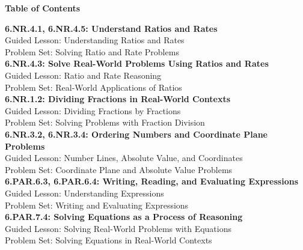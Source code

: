 \documentclass[12pt]{book}
\begin{document}
\begin{center}
    {\LARGE \textbf{Table of Contents}}\\[0.5cm]
\end{center}

\noindent
\textbf{6.NR.4.1, 6.NR.4.5: Understand Ratios and Rates}\\
\hspace*{2em} Guided Lesson: Understanding Ratios and Rates\\
\hspace*{2em} Problem Set: Solving Ratio and Rate Problems\\[0.3cm]

\textbf{6.NR.4.3: Solve Real-World Problems Using Ratios and Rates}\\
\hspace*{2em} Guided Lesson: Ratio and Rate Reasoning\\
\hspace*{2em} Problem Set: Real-World Applications of Ratios\\[0.3cm]

\textbf{6.NR.1.2: Dividing Fractions in Real-World Contexts}\\
\hspace*{2em} Guided Lesson: Dividing Fractions by Fractions\\
\hspace*{2em} Problem Set: Solving Problems with Fraction Division\\[0.3cm]

\textbf{6.NR.3.2, 6.NR.3.4: Ordering Numbers and Coordinate Plane Problems}\\
\hspace*{2em} Guided Lesson: Number Lines, Absolute Value, and Coordinates\\
\hspace*{2em} Problem Set: Coordinate Plane and Absolute Value Problems\\[0.3cm]

\textbf{6.PAR.6.3, 6.PAR.6.4: Writing, Reading, and Evaluating Expressions}\\
\hspace*{2em} Guided Lesson: Understanding Expressions\\
\hspace*{2em} Problem Set: Writing and Evaluating Expressions\\[0.3cm]

\textbf{6.PAR.7.4: Solving Equations as a Process of Reasoning}\\
\hspace*{2em} Guided Lesson: Solving Real-World Problems with Equations\\
\hspace*{2em} Problem Set: Solving Equations in Real-World Contexts\\[0.3cm]

\end{document}
